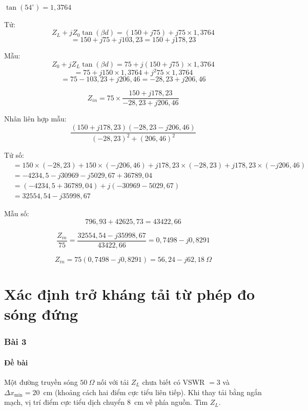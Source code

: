 \documentclass[12pt,a4paper]{article}
\begin{document}
$\tan(54^\circ) = 1{,}3764$

Tử:
\[
Z_L + jZ_0\tan(\beta d) = (150 + j75) + j75 \times 1{,}3764
\]
\[
= 150 + j75 + j103{,}23 = 150 + j178{,}23
\]

Mẫu:
\[
Z_0 + jZ_L\tan(\beta d) = 75 + j(150 + j75) \times 1{,}3764
\]
\[
= 75 + j150 \times 1{,}3764 + j^2 75 \times 1{,}3764
\]
\[
= 75 - 103{,}23 + j206{,}46 = -28{,}23 + j206{,}46
\]

\[
Z_{in} = 75 \times \frac{150 + j178{,}23}{-28{,}23 + j206{,}46}
\]

Nhân liên hợp mẫu:
\[
\frac{(150 + j178{,}23)(-28{,}23 - j206{,}46)}{(-28{,}23)^2 + (206{,}46)^2}
\]

Tử số:
\begin{align*}
&= 150 \times (-28{,}23) + 150 \times (-j206{,}46) + j178{,}23 \times (-28{,}23) + j178{,}23 \times (-j206{,}46) \\
&= -4234{,}5 - j30969 - j5029{,}67 + 36789{,}04 \\
&= (-4234{,}5 + 36789{,}04) + j(-30969 - 5029{,}67) \\
&= 32554{,}54 - j35998{,}67
\end{align*}

Mẫu số:
\[
796{,}93 + 42625{,}73 = 43422{,}66
\]

\[
\frac{Z_{in}}{75} = \frac{32554{,}54 - j35998{,}67}{43422{,}66} = 0{,}7498 - j0{,}8291
\]

\[
\boxed{Z_{in} = 75(0{,}7498 - j0{,}8291) = 56{,}24 - j62{,}18~\Omega}
\]

\newpage
\part{Xác định trở kháng tải từ phép đo sóng đứng}

\section{Bài 3}

\subsection{Đề bài}
Một đường truyền sóng $50~\Omega$ nối với tải $Z_L$ chưa biết có VSWR $= 3$ và $\Delta x_{\min} = 20$~cm (khoảng cách hai điểm cực tiểu liên tiếp). Khi thay tải bằng ngắn mạch, vị trí điểm cực tiểu dịch chuyển $8$~cm về phía nguồn. Tìm $Z_L$.
\end{document}
